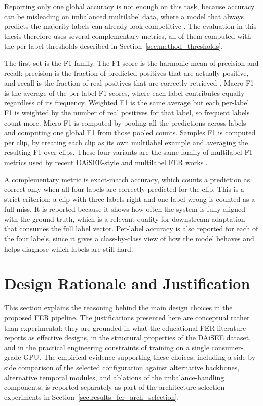 Reporting only one global accuracy is not enough on this task, because accuracy can be misleading on imbalanced multilabel data, where a model that always predicts the majority labels can already look competitive \cite{lek_academic_2023,rianto_engagement_2025}. The evaluation in this thesis therefore uses several complementary metrics, all of them computed with the per-label thresholds described in Section~\ref{sec:method_thresholds}.

The first set is the F1 family. The F1 score is the harmonic mean of precision and recall: precision is the fraction of predicted positives that are actually positive, and recall is the fraction of real positives that are correctly retrieved \cite{rianto_engagement_2025}. Macro F1 is the average of the per-label F1 scores, where each label contributes equally regardless of its frequency. Weighted F1 is the same average but each per-label F1 is weighted by the number of real positives for that label, so frequent labels count more. Micro F1 is computed by pooling all the predictions across labels and computing one global F1 from those pooled counts. Samples F1 is computed per clip, by treating each clip as its own multilabel example and averaging the resulting F1 over clips. These four variants are the same family of multilabel F1 metrics used by recent DAiSEE-style and multilabel FER works \cite{rianto_engagement_2025,fu_integrating_2025,mehta_three-dimensional_2022}.

A complementary metric is exact-match accuracy, which counts a prediction as correct only when all four labels are correctly predicted for the clip. This is a strict criterion: a clip with three labels right and one label wrong is counted as a full miss. It is reported because it shows how often the system is fully aligned with the ground truth, which is a relevant quality for downstream adaptation that consumes the full label vector. Per-label accuracy is also reported for each of the four labels, since it gives a class-by-class view of how the model behaves and helps diagnose which labels are still hard.

\section{Design Rationale and Justification}\label{sec:method_design_rationale}

This section explains the reasoning behind the main design choices in the proposed FER pipeline. The justifications presented here are conceptual rather than experimental: they are grounded in what the educational FER literature reports as effective designs, in the structural properties of the DAiSEE dataset, and in the practical engineering constraints of training on a single consumer-grade GPU. The empirical evidence supporting these choices, including a side-by-side comparison of the selected configuration against alternative backbones, alternative temporal modules, and ablations of the imbalance-handling components, is reported separately as part of the architecture-selection experiments in Section~\ref{sec:results_fer_arch_selection}.

